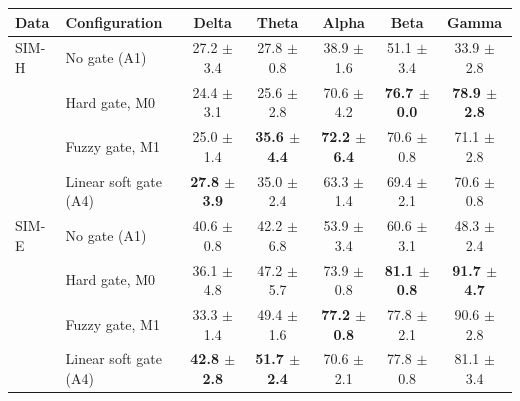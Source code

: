 \begin{tabular}{@{}llccccc@{}}
\toprule
Data & Configuration & Delta & Theta & Alpha & Beta & Gamma\\
\midrule
SIM-H & No gate (A1) & 27.2 $\pm$ 3.4 & 27.8 $\pm$ 0.8 & 38.9 $\pm$ 1.6 & 51.1 $\pm$ 3.4 & 33.9 $\pm$ 2.8\\
 & Hard gate, M0 & 24.4 $\pm$ 3.1 & 25.6 $\pm$ 2.8 & 70.6 $\pm$ 4.2 & \textbf{76.7 $\pm$ 0.0} & \textbf{78.9 $\pm$ 2.8}\\
 & Fuzzy gate, M1 & 25.0 $\pm$ 1.4 & \textbf{35.6 $\pm$ 4.4} & \textbf{72.2 $\pm$ 6.4} & 70.6 $\pm$ 0.8 & 71.1 $\pm$ 2.8\\
 & Linear soft gate (A4) & \textbf{27.8 $\pm$ 3.9} & 35.0 $\pm$ 2.4 & 63.3 $\pm$ 1.4 & 69.4 $\pm$ 2.1 & 70.6 $\pm$ 0.8\\
\midrule
SIM-E & No gate (A1) & 40.6 $\pm$ 0.8 & 42.2 $\pm$ 6.8 & 53.9 $\pm$ 3.4 & 60.6 $\pm$ 3.1 & 48.3 $\pm$ 2.4\\
 & Hard gate, M0 & 36.1 $\pm$ 4.8 & 47.2 $\pm$ 5.7 & 73.9 $\pm$ 0.8 & \textbf{81.1 $\pm$ 0.8} & \textbf{91.7 $\pm$ 4.7}\\
 & Fuzzy gate, M1 & 33.3 $\pm$ 1.4 & 49.4 $\pm$ 1.6 & \textbf{77.2 $\pm$ 0.8} & 77.8 $\pm$ 2.1 & 90.6 $\pm$ 2.8\\
 & Linear soft gate (A4) & \textbf{42.8 $\pm$ 2.8} & \textbf{51.7 $\pm$ 2.4} & 70.6 $\pm$ 2.1 & 77.8 $\pm$ 0.8 & 81.1 $\pm$ 3.4\\
\bottomrule
\end{tabular}
